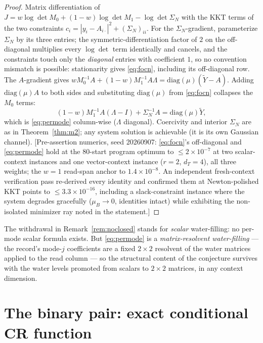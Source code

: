 \documentclass[11pt]{article}
\begin{document}
\begin{proof}
Matrix differentiation of
$J=w\log\det M_0+(1-w)\log\det M_1-\log\det\Sigma_N$ with the KKT terms
of the two constraints $c_i=|y_i-A_{i\cdot}|^2+(\Sigma_N)_{ii}$. For the
$\Sigma_N$-gradient, parameterize $\Sigma_N$ by its three entries; the
symmetric-differentiation factor of $2$ on the off-diagonal multiplies
every $\log\det$ term identically and cancels, and the constraints touch
only the \emph{diagonal} entries with coefficient $1$, so no convention
mismatch is possible: stationarity gives \eqref{eq:focn}, including its
off-diagonal row. The $A$-gradient gives
$wM_0^{-1}A+(1-w)M_1^{-1}A\Lambda=\mathrm{diag}(\mu)(\widetilde Y-A)$.
Adding $\mathrm{diag}(\mu)A$ to both sides and substituting
$\mathrm{diag}(\mu)$ from \eqref{eq:focn} collapses the $M_0$ terms:
\[
(1-w)M_1^{-1}A(\Lambda-I)+\Sigma_N^{-1}A=\mathrm{diag}(\mu)\widetilde Y,
\]
which is \eqref{eq:permode} column-wise ($\Lambda$ diagonal). Coercivity
and interior $\Sigma_N$ are as in Theorem~\ref{thm:m2}; any system
solution is achievable (it is its own Gaussian channel). [Pre-assertion
numerics, seed 20260907: \eqref{eq:focn}'s off-diagonal and
\eqref{eq:permode} hold at the 80-start program optimum to
$\le2\times10^{-7}$ at two scalar-context instances and one
vector-context instance ($r{=}2$, $d_T{=}4$), all three weights; the
$w{=}1$ read-span anchor to $1.4\times10^{-8}$. An independent
fresh-context verification pass re-derived every identity and confirmed
them at Newton-polished KKT points to $\le3.3\times10^{-16}$, including
a slack-constraint instance where the system degrades gracefully
($\mu_B\to0$, identities intact) while exhibiting the non-isolated
minimizer ray noted in the statement.]
\end{proof}

\begin{remark}
The withdrawal in Remark~\ref{rem:noclosed} stands for \emph{scalar}
water-filling: no per-mode scalar formula exists. But
\eqref{eq:permode} is a \emph{matrix-resolvent water-filling} --- the
record's mode-$j$ coefficients are a fixed $2\times2$ resolvent of the
water matrices applied to the read column --- so the structural content
of the conjecture survives with the water levels promoted from scalars to
$2\times2$ matrices, in any context dimension.
\end{remark}

\section{The binary pair: exact conditional CR function}\label{sec:binary}
\end{document}
